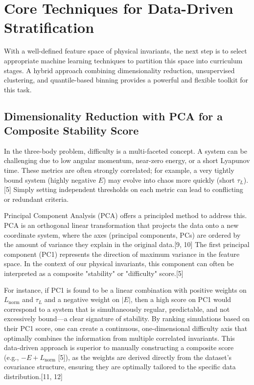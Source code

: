 \section{Core Techniques for Data-Driven Stratification}

With a well-defined feature space of physical invariants, the next step is to select appropriate machine learning techniques to partition this space into curriculum stages. A hybrid approach combining dimensionality reduction, unsupervised clustering, and quantile-based binning provides a powerful and flexible toolkit for this task.

\subsection{Dimensionality Reduction with PCA for a Composite Stability Score}

In the three-body problem, difficulty is a multi-faceted concept. A system can be challenging due to low angular momentum, near-zero energy, or a short Lyapunov time. These metrics are often strongly correlated; for example, a very tightly bound system (highly negative $E$) may evolve into chaos more quickly (short $\tau_L$).[5] Simply setting independent thresholds on each metric can lead to conflicting or redundant criteria.

Principal Component Analysis (PCA) offers a principled method to address this. PCA is an orthogonal linear transformation that projects the data onto a new coordinate system, where the axes (principal components, PCs) are ordered by the amount of variance they explain in the original data.[9, 10] The first principal component (PC1) represents the direction of maximum variance in the feature space. In the context of our physical invariants, this component can often be interpreted as a composite "stability" or "difficulty" score.[5]

For instance, if PC1 is found to be a linear combination with positive weights on $L_{\text{norm}}$ and $\tau_L$ and a negative weight on $|E|$, then a high score on PC1 would correspond to a system that is simultaneously regular, predictable, and not excessively bound---a clear signature of stability. By ranking simulations based on their PC1 score, one can create a continuous, one-dimensional difficulty axis that optimally combines the information from multiple correlated invariants. This data-driven approach is superior to manually constructing a composite score (e.g., $-E + L_{\text{norm}}$ [5]), as the weights are derived directly from the dataset's covariance structure, ensuring they are optimally tailored to the specific data distribution.[11, 12]

